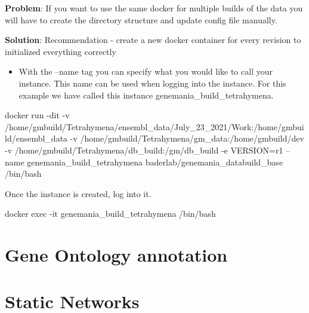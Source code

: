 \documentclass[]{book}
\newenvironment{Shaded}{\begin{snugshade}}{\end{snugshade}}
\newcommand{\ExtensionTok}[1]{#1}
\newcommand{\NormalTok}[1]{#1}
\providecommand{\tightlist}{%
  \setlength{\itemsep}{0pt}\setlength{\parskip}{0pt}}
\newenvironment{rmdblock}[1]
  {\begin{shaded*}
  \begin{itemize}
  \renewcommand{\labelitemi}{
    \raisebox{-.7\height}[0pt][0pt]{
      {\setkeys{Gin}{width=3em,keepaspectratio}\texttt{[image: images/\#1]}}
    }
  }
  \item
  }
  {
  \end{itemize}
  \end{shaded*}
  }
\newenvironment{rmd-troubleshooting}
  {\begin{rmdblock}{troubleshooting}}
  {\end{rmdblock}}
\begin{document}
\begin{rmd-troubleshooting}
\textbf{Problem}: If you want to use the same docker for multiple builds
of the data you will have to create the directory structure and update
config file manually.

\textbf{Solution}: Recommendation - create a new docker container for
every revision to initialized everything correctly
\end{rmd-troubleshooting}

\begin{itemize}
\tightlist
\item
  With the --name tag you can specify what you would like to call your
  instance. This name can be used when logging into the instance. For
  this example we have called this instance
  genemania\_build\_tetrahymena.
\end{itemize}

\begin{Shaded}
\begin{Highlighting}[]

\ExtensionTok{docker}\NormalTok{ run -dit }
\ExtensionTok{-v}\NormalTok{ /home/gmbuild/Tetrahymena/ensembl_data/July_23_2021/Work:/home/gmbuild/ensembl_data }
\ExtensionTok{-v}\NormalTok{ /home/gmbuild/Tetrahymena/gm_data:/home/gmbuild/dev }
\ExtensionTok{-v}\NormalTok{ /home/gmbuild/Tetrahymena/db_build:/gm/db_build }
\ExtensionTok{-e}\NormalTok{ VERSION=r1 }
\ExtensionTok{--name}\NormalTok{ genemania_build_tetrahymena }
\ExtensionTok{baderlab/genemania_databuild_base}\NormalTok{ /bin/bash}
\end{Highlighting}
\end{Shaded}

Once the instance is created, log into it.

\begin{Shaded}
\begin{Highlighting}[]
\ExtensionTok{docker}\NormalTok{ exec -it genemania_build_tetrahymena /bin/bash}
\end{Highlighting}
\end{Shaded}

\section{Gene Ontology annotation}\label{gene-ontology-annotation}

\section{Static Networks}\label{static-networks}


\end{document}
